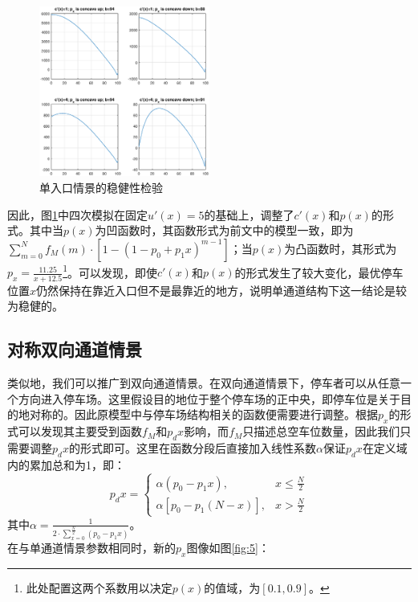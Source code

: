 \documentclass{thuemp}
\begin{document}
\begin{figure}[H]
    \centering
    \includegraphics[width=0.5\textwidth]{single_entrance_robust.eps}
    \caption{单入口情景的稳健性检验}
    \label{fig:4}    
\end{figure}

\par 因此，图\ref{fig:4}中四次模拟在固定$u'(x)=5$的基础上，调整了$c'(x)$和$p(x)$的形式。其中当$p(x)$为凹函数时，其函数形式为前文中的模型一致，即为$\sum_{m=0}^{N}f_M(m)\cdot [1-(1-p_0+p_1x)^{m-1}]$；当$p(x)$为凸函数时，其形式为$p_x=\frac{11.25}{x+12.5}$\footnote{此处配置这两个系数用以决定$p(x)$的值域，为$[0.1,0.9]$。}。可以发现，即使$c'(x)$和$p(x)$的形式发生了较大变化，最优停车位置$x$仍然保持在靠近入口但不是最靠近的地方，说明单通道结构下这一结论是较为稳健的。


\subsection{对称双向通道情景}

\par 类似地，我们可以推广到双向通道情景。在双向通道情景下，停车者可以从任意一个方向进入停车场。这里假设目的地位于整个停车场的正中央，即停车位是关于目的地对称的。因此原模型中与停车场结构相关的函数便需要进行调整。根据$p_x$的形式可以发现其主要受到函数$f_M$和$p_dx$影响，而$f_M$只描述总空车位数量，因此我们只需要调整$p_dx$的形式即可。这里在函数分段后直接加入线性系数$\alpha$保证$p_dx$在定义域内的累加总和为1，即：
$$p_dx = \begin{cases}
    \alpha(p_0-p_1x), & x\leq \frac{N}{2}\\
    \alpha[p_0-p_1(N-x)], & x>\frac{N}{2}
\end{cases}$$
其中$\alpha = \frac{1}{2\cdot\sum_{x=0}^{\frac{N}{2}}(p_0-p_1x)}$。\\
在与单通道情景参数相同时，新的$p_x$图像如图\ref{fig:5}：
\end{document}
